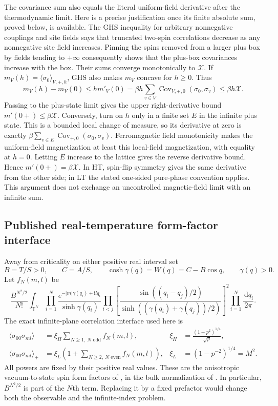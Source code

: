 \documentclass[11pt]{article}
\numberwithin{equation}{section}
\theoremstyle{definition}
\newcommand{\T}{\mathbb T}
\newcommand{\dd}{\,\mathrm d}
\newcommand{\ii}{\mathrm i}
\begin{document}
The covariance sum also equals the literal uniform-field derivative after
the thermodynamic limit. Here is a precise justification once its finite
absolute sum, proved below, is available. The GHS inequality for arbitrary
nonnegative couplings and site fields \cite[Theorem 1.5]{CGN} says that
truncated two-spin correlations decrease as any nonnegative site field
increases. Pinning the spins removed from a larger plus box by fields
tending to $+\infty$ consequently shows that the plus-box covariances
increase with the box. Their sums converge monotonically to $\mathcal X$.
If $m_V(h)=\langle\sigma_0\rangle_{V,+,h}$, GHS also makes $m_V$
concave for $h\ge0$. Thus
\[
 m_V(h)-m_V(0)\le h m'_V(0)
 =\beta h\sum_{v\in V}\operatorname{Cov}_{V,+,0}(\sigma_0,\sigma_v)
 \le\beta h\mathcal X.
\]
Passing to the plus-state limit gives the upper right-derivative bound
$m'(0+)\le\beta\mathcal X$. Conversely, turn on $h$ only in a finite
set $E$ in the infinite plus state. This is a bounded local change of
measure, so its derivative at zero is exactly
$\beta\sum_{v\in E}\operatorname{Cov}_{+,0}(\sigma_0,\sigma_v)$.
Ferromagnetic field monotonicity makes the uniform-field magnetization
at least this local-field magnetization, with equality at $h=0$.
Letting $E$ increase to the lattice gives the reverse derivative bound.
Hence $m'(0+)=\beta\mathcal X$. In HT, spin-flip symmetry gives the
same derivative from the other side; in LT the stated one-sided
pure-phase convention applies. This argument does not exchange an
uncontrolled magnetic-field limit with an infinite sum.

\subsection{Published real-temperature form-factor interface}
Away from criticality on either positive real interval set
\[
 B=T/S>0,\qquad C=A/S,\qquad
 \cosh\gamma(q)=W(q)=C-B\cos q,\qquad \gamma(q)>0.
\]
Let $f_N(m,l)$ be
\begin{equation}\label{eq:corrFF}
 \frac{B^{N^2/2}}{N!}\int_{\T^N}
 \prod_{i=1}^N\frac{e^{-|m|\gamma(q_i)+\ii lq_i}}{\sinh\gamma(q_i)}
 \prod_{i<j}\left[
 \frac{\sin((q_i-q_j)/2)}{\sinh((\gamma(q_i)+\gamma(q_j))/2)}
 \right]^2\prod_{i=1}^N\frac{\dd q_i}{2\pi}.
\end{equation}
The exact infinite-plane correlation interface used here is
\begin{align}
 \langle\sigma_{00}\sigma_{ml}\rangle
   &=\xi_H\sum_{N\ge1,\ N\text{ odd}}f_N(m,l),
   &\xi_H&=\frac{(1-p^2)^{1/4}}{\sqrt p},\label{eq:HTcorr}\\
 \langle\sigma_{00}\sigma_{ml}\rangle_+
   &=\xi_L\left(1+\sum_{N\ge2,\ N\text{ even}}f_N(m,l)\right),
   &\xi_L&=(1-p^{-2})^{1/4}=M^2.\label{eq:LTcorr}
\end{align}
All powers are fixed by their positive real values. These are the
anisotropic vacuum-to-state spin form factors of
\cite{BL,IL}, in the bulk normalization of \cite{ONGP}. In particular,
$B^{N^2/2}$ is part of the $N$th term. Replacing it by a fixed prefactor
would change both the observable and the infinite-index problem.
\end{document}
